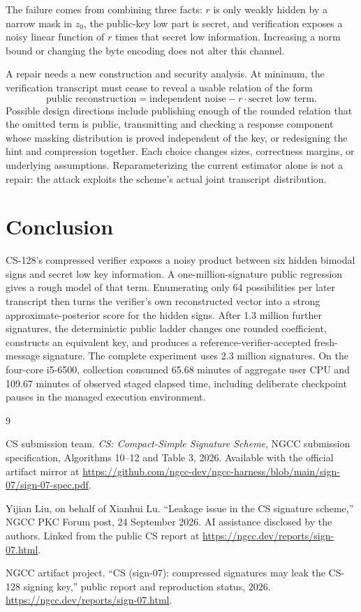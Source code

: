 \documentclass[11pt]{article}
\begin{document}
The failure comes from combining three facts: $r$ is only weakly hidden by a narrow mask in
$z_0$, the public-key low part is secret, and verification exposes a noisy linear function of
$r$ times that secret low information.  Increasing a norm bound or changing the byte encoding
does not alter this channel.

A repair needs a new construction and security analysis.  At minimum, the verification
transcript must cease to reveal a usable relation of the form
\[
 \text{public reconstruction}=\text{independent noise}-r\cdot
 \text{secret low term}.
\]
Possible design directions include publishing enough of the rounded relation that the omitted
term is public, transmitting and checking a response component whose masking distribution is
proved independent of the key, or redesigning the hint and compression together.  Each choice
changes sizes, correctness margins, or underlying assumptions.  Reparameterizing the current
estimator alone is not a repair: the attack exploits the scheme's actual joint transcript
distribution.

\section{Conclusion}

CS-128's compressed verifier exposes a noisy product between six hidden bimodal signs and
secret low key information.  A one-million-signature public regression gives a rough model of
that term.  Enumerating only 64 possibilities per later transcript then turns the verifier's
own reconstructed vector into a strong approximate-posterior score for the hidden signs.  After
1.3 million further signatures, the deterministic public ladder changes one rounded coefficient,
constructs an equivalent key, and produces a reference-verifier-accepted fresh-message
signature.  The complete experiment uses 2.3 million signatures.  On the four-core i5-6500,
collection consumed 65.68 minutes of aggregate user CPU and 109.67 minutes of observed staged
elapsed time, including deliberate checkpoint pauses in the managed execution environment.

\begin{thebibliography}{9}

CS submission team.
\newblock \emph{CS: Compact-Simple Signature Scheme}, NGCC submission specification,
Algorithms 10--12 and Table 3, 2026.
\newblock Available with the official artifact mirror at
\url{https://github.com/ngcc-dev/ngcc-harness/blob/main/sign-07/sign-07-spec.pdf}.

Yijian Liu, on behalf of Xianhui Lu.
\newblock ``Leakage issue in the CS signature scheme,'' NGCC PKC Forum post,
24 September 2026.  AI assistance disclosed by the authors.
\newblock Linked from the public CS report at
\url{https://ngcc.dev/reports/sign-07.html}.

NGCC artifact project.
\newblock ``CS (sign-07): compressed signatures may leak the CS-128 signing key,''
public report and reproduction status, 2026.
\newblock \url{https://ngcc.dev/reports/sign-07.html}.

\end{thebibliography}
\end{document}
